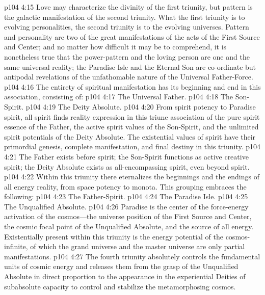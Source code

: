 \vs p104 4:15 Love may characterize the divinity of the first triunity, but pattern is the galactic manifestation of the second triunity. What the first triunity is to evolving personalities, the second triunity is to the evolving universes. Pattern and personality are two of the great manifestations of the acts of the First Source and Center; and no matter how difficult it may be to comprehend, it is nonetheless true that the power\hyp{}pattern and the loving person are one and the same universal reality; the Paradise Isle and the Eternal Son are co\hyp{}ordinate but antipodal revelations of the unfathomable nature of the Universal Father\hyp{}Force.
\pc \vs p104 4:16  The entirety of spiritual manifestation has its beginning and end in this association, consisting of:
\pc \vs p104 4:17 \bibnobreakspace The Universal Father.
\vs p104 4:18 \bibnobreakspace The Son\hyp{}Spirit.
\vs p104 4:19 \bibnobreakspace The Deity Absolute.
\pc \vs p104 4:20 From spirit potency to Paradise spirit, all spirit finds reality expression in this triune association of the pure spirit essence of the Father, the active spirit values of the Son\hyp{}Spirit, and the unlimited spirit potentials of the Deity Absolute. The existential values of spirit have their primordial genesis, complete manifestation, and final destiny in this triunity.
\vs p104 4:21 The Father exists before spirit; the Son\hyp{}Spirit functions as active creative spirit; the Deity Absolute exists as all\hyp{}encompassing spirit, even beyond spirit.
\pc \vs p104 4:22  Within this triunity there eternalizes the beginnings and the endings of all energy reality, from space potency to monota. This grouping embraces the following:
\pc \vs p104 4:23 \bibnobreakspace The Father\hyp{}Spirit.
\vs p104 4:24 \bibnobreakspace The Paradise Isle.
\vs p104 4:25 \bibnobreakspace The Unqualified Absolute.
\pc \vs p104 4:26 Paradise is the center of the force\hyp{}energy activation of the cosmos---the universe position of the First Source and Center, the cosmic focal point of the Unqualified Absolute, and the source of all energy. Existentially present within this triunity is the energy potential of the cosmos\hyp{}infinite, of which the grand universe and the master universe are only partial manifestations.
\vs p104 4:27 The fourth triunity absolutely controls the fundamental units of cosmic energy and releases them from the grasp of the Unqualified Absolute in direct proportion to the appearance in the experiential Deities of subabsolute capacity to control and stabilize the metamorphosing cosmos.
